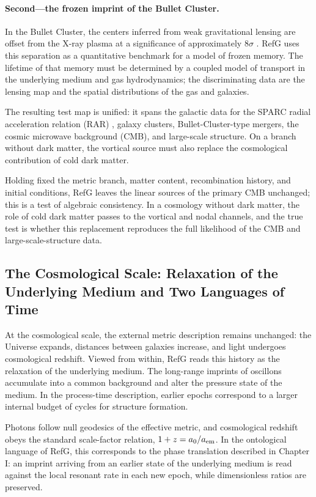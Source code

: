\documentclass[11pt,a4paper]{article}
\begin{document}
\paragraph{Second---the frozen imprint of the Bullet Cluster.} In the Bullet Cluster, the centers inferred from weak gravitational lensing are offset from the X-ray plasma at a significance of approximately $8\sigma$ \citep{clowe2006}. RefG uses this separation as a quantitative benchmark for a model of frozen memory. The lifetime of that memory must be determined by a coupled model of transport in the underlying medium and gas hydrodynamics; the discriminating data are the lensing map and the spatial distributions of the gas and galaxies.

The resulting test map is unified: it spans the galactic data for the SPARC radial acceleration relation (RAR) \citep{lelli2016,mcgaugh2016}, galaxy clusters, Bullet-Cluster-type mergers, the cosmic microwave background (CMB), and large-scale structure. On a branch without dark matter, the vortical source must also replace the cosmological contribution of cold dark matter.

Holding fixed the metric branch, matter content, recombination history, and initial conditions, RefG leaves the linear sources of the primary CMB unchanged; this is a test of algebraic consistency. In a cosmology without dark matter, the role of cold dark matter passes to the vortical and nodal channels, and the true test is whether this replacement reproduces the full likelihood of the CMB and large-scale-structure data.

\subsection{The Cosmological Scale: Relaxation of the Underlying Medium and Two Languages of Time}

At the cosmological scale, the external metric description remains unchanged: the Universe expands, distances between galaxies increase, and light undergoes cosmological redshift. Viewed from within, RefG reads this history as the relaxation of the underlying medium. The long-range imprints of oscillons accumulate into a common background and alter the pressure state of the medium. In the process-time description, earlier epochs correspond to a larger internal budget of cycles for structure formation.

Photons follow null geodesics of the effective metric, and cosmological redshift obeys the standard scale-factor relation, $1+z=a_0/a_{\rm em}$. In the ontological language of RefG, this corresponds to the phase translation described in Chapter I: an imprint arriving from an earlier state of the underlying medium is read against the local resonant rate in each new epoch, while dimensionless ratios are preserved.
\end{document}
